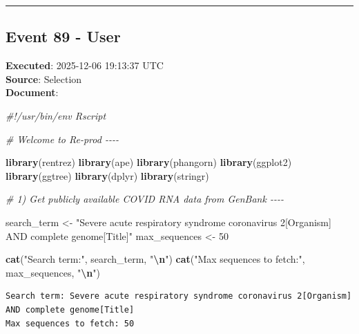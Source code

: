 \documentclass[
  11pt,
]{article}
\newenvironment{Shaded}{\begin{snugshade}}{\end{snugshade}}
\newcommand{\CommentTok}[1]{\textcolor[rgb]{0.56,0.35,0.01}{\textit{#1}}}
\newcommand{\DecValTok}[1]{\textcolor[rgb]{0.00,0.00,0.81}{#1}}
\newcommand{\FunctionTok}[1]{\textcolor[rgb]{0.13,0.29,0.53}{\textbf{#1}}}
\newcommand{\NormalTok}[1]{#1}
\newcommand{\OtherTok}[1]{\textcolor[rgb]{0.56,0.35,0.01}{#1}}
\newcommand{\SpecialCharTok}[1]{\textcolor[rgb]{0.81,0.36,0.00}{\textbf{#1}}}
\newcommand{\StringTok}[1]{\textcolor[rgb]{0.31,0.60,0.02}{#1}}
\newenvironment{rpoutput}{\vspace{0.5em}\begin{snugshade}}{\end{snugshade}}
\begin{document}
\begin{center}\rule{0.5\linewidth}{0.5pt}\end{center}

\subsection{Event 89 - User}\label{event-89---user}

\textbf{Executed}: 2025-12-06 19:13:37 UTC\\
\textbf{Source}: Selection\\
\textbf{Document}:

\begin{Shaded}
\begin{Highlighting}[]
\CommentTok{\#!/usr/bin/env Rscript}

\CommentTok{\# Welcome to Re{-}prod {-}{-}{-}{-}}

\FunctionTok{library}\NormalTok{(rentrez)}
\FunctionTok{library}\NormalTok{(ape)}
\FunctionTok{library}\NormalTok{(phangorn)}
\FunctionTok{library}\NormalTok{(ggplot2)}
\FunctionTok{library}\NormalTok{(ggtree)}
\FunctionTok{library}\NormalTok{(dplyr)}
\FunctionTok{library}\NormalTok{(stringr)}

\CommentTok{\# 1) Get publicly available COVID RNA data from GenBank {-}{-}{-}{-}}

\NormalTok{search\_term }\OtherTok{\textless{}{-}} \StringTok{"Severe acute respiratory syndrome coronavirus 2[Organism] AND complete genome[Title]"}
\NormalTok{max\_sequences }\OtherTok{\textless{}{-}} \DecValTok{50}

\FunctionTok{cat}\NormalTok{(}\StringTok{"Search term:"}\NormalTok{, search\_term, }\StringTok{"}\SpecialCharTok{\textbackslash{}n}\StringTok{"}\NormalTok{)}
\FunctionTok{cat}\NormalTok{(}\StringTok{"Max sequences to fetch:"}\NormalTok{, max\_sequences, }\StringTok{"}\SpecialCharTok{\textbackslash{}n}\StringTok{"}\NormalTok{)}
\end{Highlighting}
\end{Shaded}

\begin{rpoutput}

\begin{verbatim}
Search term: Severe acute respiratory syndrome coronavirus 2[Organism] AND complete genome[Title] 
Max sequences to fetch: 50 
\end{verbatim}

\end{rpoutput}
\end{document}
